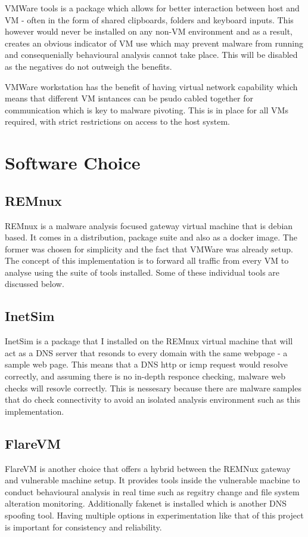 VMWare tools is a package which allows for better interaction between host and VM - often in the form of shared clipboards, folders and keyboard inputs. This however would never be installed on any non-VM environment and as a result, creates an obvious indicator of VM use which may prevent malware from running and consequenially behavioural analysis cannot take place. This will be disabled as the negatives do not outweigh the benefits.

VMWare workstation has the benefit of having virtual network capability which means that different VM isntances can be psudo cabled together for communication which is key to malware pivoting. This is in place for all VMs required, with strict restrictions on access to the host system.


\section{Software Choice}
\subsection{REMnux}
REMnux is a malware analysis focused gateway virtual machine that is debian based. It comes in a distribution, package suite and also as a docker image. The former was chosen for simplicity and the fact that VMWare was already setup. The concept of this implementation is to
forward all traffic from every VM to analyse using the suite of tools installed. Some of these individual tools are discussed below.
\subsection{InetSim}
InetSim is a package that I installed on the REMnux virtual machine that will act as a DNS server that resonds to every domain with the same webpage - a sample web page. This means that a DNS http or icmp request would resolve correctly, and assuming there is no in-depth responce checking, malware web checks will resovle correctly. 
This is nessesary because there are malware samples that do check connectivity to avoid an isolated analysis environment such as this implementation.
\subsection{FlareVM} 
FlareVM is another choice that offers a hybrid between the REMNux gateway and vulnerable machine setup. It provides tools inside the vulnerable macbine to conduct behavioural analysis in real time such as regsitry change and file system alteration monitoring. Additionally fakenet is installed which is another DNS spoofing tool. Having multiple options in experimentation like that of this project is important for consistency and reliability. 
